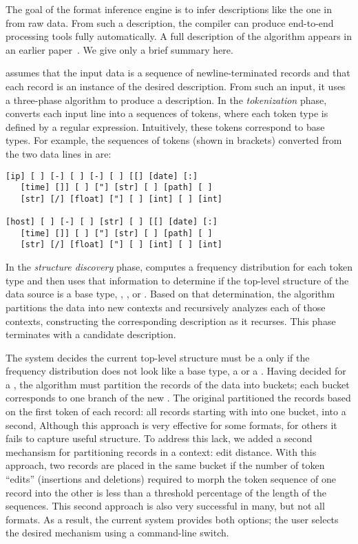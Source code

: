 The goal of the \learnpads{} format inference engine is to infer 
\pads{} descriptions like the one in  from raw data.
From such a description, the \pads{} compiler can produce end-to-end
processing tools fully automatically.  A full description of the
\learnpads{} algorithm appears in an earlier
paper~\cite{Fisher+:dirttoshovels}. We give only a brief summary
here. 

\learnpads{} assumes that the input data is a sequence of
newline-terminated records and that each record is an instance of the
desired description.  From such an input, it uses a three-phase
algorithm to produce a description.  In the {\em tokenization} phase,
\learnpads{} converts each input line into a sequences of tokens,
where each token type is defined by a regular expression.
Intuitively, these tokens correspond to \pads{} base types.
For example, the sequences of
tokens (shown in brackets) converted from the two data lines 
in  are:

{\small
\begin{verbatim}
[ip] [ ] [-] [ ] [-] [ ] [[] [date] [:] 
   [time] []] [ ] ["] [str] [ ] [path] [ ] 
   [str] [/] [float] ["] [ ] [int] [ ] [int]

[host] [ ] [-] [ ] [str] [ ] [[] [date] [:] 
   [time] []] [ ] ["] [str] [ ] [path] [ ] 
   [str] [/] [float] ["] [ ] [int] [ ] [int]
\end{verbatim}
}

In the {\em structure discovery} phase, \learnpads{} computes a
frequency distribution for each token type and then uses that
information to determine if the top-level structure of the data source
is a base type, , , or .  Based on
that determination, the algorithm partitions the data into new
contexts and recursively analyzes each of those contexts, constructing
the corresponding description as it recurses.  This phase terminates
with a candidate description.  

The \learnpads{} system decides the current top-level structure must
be a  only if the frequency distribution does not look like
a base type, a  or a .  Having decided for a
, the algorithm must partition the records of the data into
buckets; each bucket corresponds to one branch of the new
.  The original \learnpads{} partitioned the records
based on the first token of each record: all records starting with
 into one bucket,  into a second, \etc{}  
Although this approach is very effective for some formats, for others
it fails to capture useful structure.  To address this lack, we added
a second mechansism for partitioning records in a 
context: edit distance.  With this approach, two records are placed in
the same bucket if the number of token ``edits'' (insertions and
deletions) required to morph the token sequence of one record into the
other is less than a threshold percentage of the length of the
sequences.   This second approach is also very successful in many, but
not all formats.  As a result, the current \learnpads{} system
provides both options; the user selects the desired mechanism using a
command-line switch.


